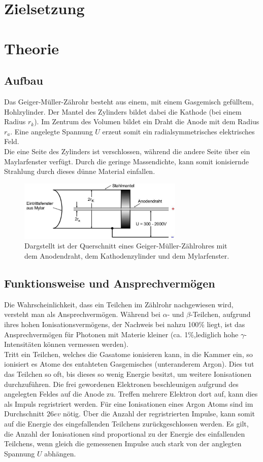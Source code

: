 \newpage
\section*{Zielsetzung}
\section{Theorie}
\subsection{Aufbau}
Das Geiger-Müller-Zährohr besteht aus einem, mit einem Gasgemisch gefülltem,
Hohlzylinder. Der Mantel des Zylinders bildet dabei die Kathode (bei einem Radius $r_k$).
Im Zentrum des Volumen bildet ein Draht die Anode mit dem Radius $r_a$. Eine angelegte
Spannung $U$ erzeut somit ein radialsymmetrisches elektrisches Feld.\\
Die eine Seite des Zylinders ist verschlossen, während die andere Seite über ein 
Maylarfenster verfügt. Durch die geringe Massendichte, kann somit ionisiernde Strahlung durch
dieses dünne Material einfallen.

\begin{figure}
    \centering
    \includegraphics[width=0.7\textwidth]{input/querschnitt.jpg}
    \caption{Dargstellt ist der Querschnitt eines Geiger-Müller-Zählrohres mit
    dem Anodendraht, dem Kathodenzylinder und dem Mylarfenster.\cite[220]{anleitung}}
\end{figure}
\subsection{Funktionsweise und Ansprechvermögen}
Die Wahrscheinlichkeit, dass ein Teilchen im Zählrohr nachgewiesen wird,
versteht man als Ansprechvermögen. Während bei $\alpha$- und $\beta$-Teilchen, aufgrund
ihres hohen Ionisationsvermögens, der Nachweis bei nahzu 100\% liegt, ist das 
Ansprechvermögen für Photonen mit Materie kleiner (ca. 1\%,lediglich hohe $\gamma$-
Intensitäten können vermessen werden).\\
Tritt ein Teilchen, welches die Gasatome ionisieren kann, in die Kammer ein, so
ionisiert es Atome des entahteten Gasgemisches (unteranderem Argon). Dies tut 
das Teilchen so oft, bis dieses so wenig Energie besitzt, um weitere Ionisationen durchzuführen. 
Die frei gewordenen Elektronen beschleunigen aufgrund des angelegten Feldes auf die 
Anode zu. Treffen mehrere Elektron dort auf, kann dies als Impuls regristriert werden.
Für eine Ionisationen eines Argon Atoms sind im Durchschnitt $26\si{ev}$ nötig.
Über die Anzahl der regristrierten Impulse, kann somit auf die Energie des eingefallenden Teilchens
zurückgeschlossen werden. Es gilt, die Anzahl der Ionisationen sind proportional zu
der Energie des einfallenden Teilchens, wenn gleich die gemessenen Impulse 
auch stark von der anglegten Spannung $U$ abhängen.

